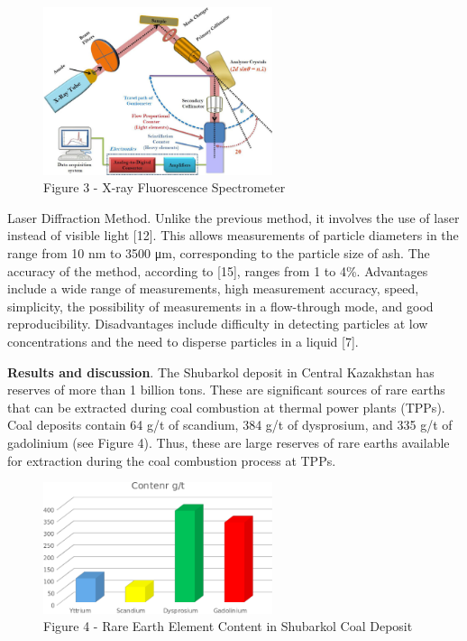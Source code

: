 \begin{figure}[H]
	\centering
	\includegraphics[width=0.6\textwidth]{assets/1051}
	\caption*{Figure 3 - X-ray Fluorescence Spectrometer}
\end{figure}

\begin{multicols}{2}
Laser Diffraction Method. Unlike the previous method, it involves the
use of laser instead of visible light {[}12{]}. This allows measurements
of particle diameters in the range from 10 nm to 3500 μm, corresponding
to the particle size of ash. The accuracy of the method, according to
{[}15{]}, ranges from 1 to 4\%. Advantages include a wide range of
measurements, high measurement accuracy, speed, simplicity, the
possibility of measurements in a flow-through mode, and good
reproducibility. Disadvantages include difficulty in detecting particles
at low concentrations and the need to disperse particles in a liquid
{[}7{]}.

{\bfseries Results and discussion}. The Shubarkol deposit in Central
Kazakhstan has reserves of more than 1 billion tons. These are
significant sources of rare earths that can be extracted during coal
combustion at thermal power plants (TPPs). Coal deposits contain 64 g/t
of scandium, 384 g/t of dysprosium, and 335 g/t of gadolinium (see
Figure 4). Thus, these are large reserves of rare earths available for
extraction during the coal combustion process at TPPs.
\end{multicols}

\begin{figure}[H]
	\centering
	\includegraphics[width=0.6\textwidth]{assets/1083}
	\caption*{Figure 4 - Rare Earth Element Content in Shubarkol Coal Deposit}
\end{figure}

